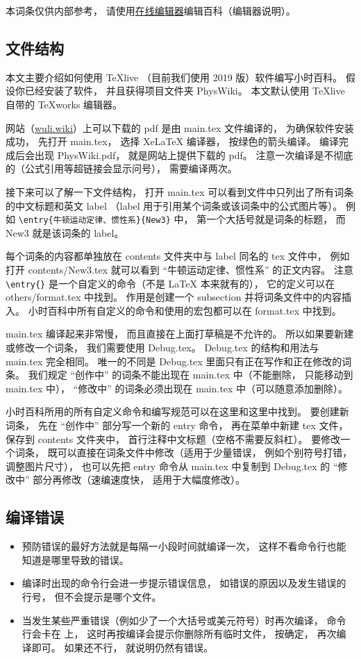 
本词条仅供内部参考， 请使用\href{https://wuli.wiki/editor}{在线编辑器}编辑百科（编辑器说明）。

\subsection{文件结构}

本文主要介绍如何使用 TeXlive （目前我们使用 2019 版）软件编写小时百科。 假设你已经安装了软件， 并且获得项目文件夹 PhysWiki。 本文默认使用 TeXlive 自带的 TeXworks 编辑器。

网站（\href{https://wuli.wiki}{wuli.wiki}）上可以下载的 pdf 是由 main.tex 文件编译的， 为确保软件安装成功， 先打开 main.tex， 选择 XeLaTeX 编译器， 按绿色的箭头编译。 编译完成后会出现 PhysWiki.pdf， 就是网站上提供下载的 pdf。 注意一次编译是不彻底的（公式引用等超链接会显示问号）， 需要编译两次。

接下来可以了解一下文件结构， 打开 main.tex 可以看到文件中只列出了所有词条的中文标题和英文 label （label 用于引用某个词条或该词条中的公式图片等）。 例如 \verb|\entry{牛顿运动定律、惯性系}{New3}| 中， 第一个大括号就是词条的标题， 而 New3 就是该词条的 label。

每个词条的内容都单独放在 contents 文件夹中与 label 同名的 tex 文件中， 例如打开 contents/New3.tex 就可以看到 “牛顿运动定律、惯性系” 的正文内容。 注意 \verb|\entry{}| 是一个自定义的命令（不是 LaTeX 本来就有的）， 它的定义可以在 others/format.tex 中找到。 作用是创建一个 subsection 并将词条文件中的内容插入。 小时百科中所有自定义的命令和使用的宏包都可以在 format.tex 中找到。

main.tex 编译起来非常慢， 而且直接在上面打草稿是不允许的。 所以如果要新建或修改一个词条， 我们需要使用 Debug.tex。 Debug.tex 的结构和用法与 main.tex 完全相同。 唯一的不同是 Debug.tex 里面只有正在写作和正在修改的词条。 我们规定 “创作中” 的词条不能出现在 main.tex 中（不能删除， 只能移动到 main.tex 中）， “修改中” 的词条必须出现在 main.tex 中（可以随意添加删除）。

小时百科所用的所有自定义命令和编写规范可以在这里和这里中找到。 要创建新词条， 先在 “创作中” 部分写一个新的 entry 命令， 再在菜单中新建 tex 文件， 保存到 contents 文件夹中， 首行注释中文标题（空格不需要反斜杠）。 要修改一个词条， 既可以直接在词条文件中修改（适用于少量错误， 例如个别符号打错， 调整图片尺寸）， 也可以先把 entry 命令从 main.tex 中复制到 Debug.tex 的 “修改中” 部分再修改（速编速度快， 适用于大幅度修改）。

\subsection{编译错误}

\begin{itemize}
\item 预防错误的最好方法就是每隔一小段时间就编译一次， 这样不看命令行也能知道是哪里导致的错误。
\item 编译时出现的命令行会进一步提示错误信息， 如错误的原因以及发生错误的行号， 但不会提示是哪个文件。
\item 当发生某些严重错误（例如少了一个大括号或美元符号）时再次编译， 命令行会卡在 \verb|| 上， 这时再按编译会提示你删除所有临时文件， 按确定， 再次编译即可。 如果还不行， 就说明仍然有错误。
\end{itemize}
